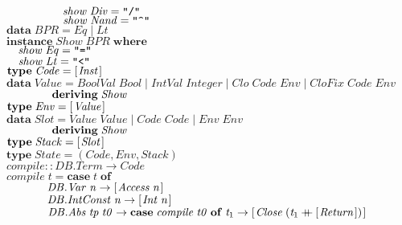 \documentclass[10pt]{article}
\newcommand{\Conid}[1]{\mathit{#1}}
\newcommand{\Varid}[1]{\mathit{#1}}
\newcommand{\plus}{\mathbin{+\!\!\!+}}
\begin{document}
\begin{hscode}
${\hskip5.00em\relax\Varid{show}\;\Conid{Div}\mathrel{=}\text{\tt \char34 /\char34}}$\\
${\hskip5.00em\relax\Varid{show}\;\Conid{Nand}\mathrel{=}\text{\tt \char34 \char94 \char34}}$\\
${}$\\
${\mathbf{data}\;\Conid{BPR}\mathrel{=}\Conid{Eq}\mid \Conid{Lt}}$\\
${\mathbf{instance}\;\Conid{Show}\;\Conid{BPR}\;\mathbf{where}}$\\
${\hskip1.00em\relax\Varid{show}\;\Conid{Eq}\mathrel{=}\text{\tt \char34 =\char34}}$\\
${\hskip1.00em\relax\Varid{show}\;\Conid{Lt}\mathrel{=}\text{\tt \char34 <\char34}}$\\
${}$\\
${\mathbf{type}\;\Conid{Code}\mathrel{=}[\mskip1.5mu \Conid{Inst}\mskip1.5mu]}$\\
${\mathbf{data}\;\Conid{Value}\mathrel{=}\Conid{BoolVal}\;\Conid{Bool}\mid \Conid{IntVal}\;\Conid{Integer}\mid \Conid{Clo}\;\Conid{Code}\;\Conid{Env}\mid \Conid{CloFix}\;\Conid{Code}\;\Conid{Env}}$\\
${\hskip4.00em\relax\mathbf{deriving}\;\Conid{Show}}$\\
${\mathbf{type}\;\Conid{Env}\mathrel{=}[\mskip1.5mu \Conid{Value}\mskip1.5mu]}$\\
${\mathbf{data}\;\Conid{Slot}\mathrel{=}\Conid{Value}\;\Conid{Value}\mid \Conid{Code}\;\Conid{Code}\mid \Conid{Env}\;\Conid{Env}}$\\
${\hskip4.00em\relax\mathbf{deriving}\;\Conid{Show}}$\\
${\mathbf{type}\;\Conid{Stack}\mathrel{=}[\mskip1.5mu \Conid{Slot}\mskip1.5mu]}$\\
${\mathbf{type}\;\Conid{State}\mathrel{=}(\Conid{Code},\Conid{Env},\Conid{Stack})}$\\
${\Varid{compile}\mathbin{::}\Conid{\Conid{DB}.Term}\to \Conid{Code}}$\\
${\Varid{compile}\;\Varid{t}\mathrel{=}\mathbf{case}\;\Varid{t}\;\mathbf{of}}$\\
${\phantom{\Varid{compile}\;\mbox{}}\Conid{\Conid{DB}.Var}\;\Varid{n}\to [\mskip1.5mu \Conid{Access}\;\Varid{n}\mskip1.5mu]}$\\
${\phantom{\Varid{compile}\;\mbox{}}\Conid{\Conid{DB}.IntConst}\;\Varid{n}\to [\mskip1.5mu \Conid{Int}\;\Varid{n}\mskip1.5mu]}$\\
${\phantom{\Varid{compile}\;\mbox{}}\Conid{\Conid{DB}.Abs}\;\Varid{tp}\;\Varid{t0}\to \mathbf{case}\;\Varid{compile}\;\Varid{t0}\;\mathbf{of}\;\Varid{t}_{1}\to [\mskip1.5mu \Conid{Close}\;(\Varid{t}_{1}\plus [\mskip1.5mu \Conid{Return}\mskip1.5mu])\mskip1.5mu]}$\\

\end{hscode}
\end{document}
